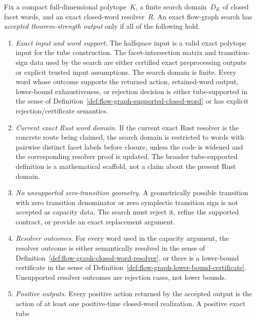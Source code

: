 \begin{unverified}
\begin{definition}%
\label{def:flow-graph-exact-accepted-output-contract}
Fix a compact full-dimensional polytope~$K$, a finite search domain~$D_K$ of
closed facet words, and an exact closed-word resolver~$R$.  An exact
flow-graph search has \emph{accepted theorem-strength output} only if all of
the following hold.
\begin{enumerate}
  \item \emph{Exact input and word support.}
    The halfspace input is a valid exact polytope input for the tube
    construction.  The facet-intersection matrix and transition-sign data used
    by the search are either certified exact preprocessing outputs or explicit
    trusted input assumptions.  The search domain is finite.  Every word whose
    outcome supports the returned action, retained-word output, lower-bound
    exhaustiveness, or rejection decision is either tube-supported in the sense
    of Definition~\ref{def:flow-graph-supported-closed-word} or has explicit
    rejection/certificate semantics.
  \item \emph{Current exact Rust word domain.}
    If the current exact Rust resolver is the concrete route being claimed, the
    search domain is restricted to words with pairwise distinct facet labels
    before closure, unless the code is widened and the corresponding resolver
    proof is updated.  The broader tube-supported definition is a mathematical
    scaffold, not a claim about the present Rust domain.
  \item \emph{No unsupported zero-transition geometry.}
    A geometrically possible transition with zero transition denominator or
    zero symplectic transition sign is not accepted as capacity data.  The
    search must reject it, refine the supported contract, or provide an exact
    replacement argument.
  \item \emph{Resolver outcomes.}
    For every word used in the capacity argument, the resolver outcome is
    either semantically resolved in the sense of
    Definition~\ref{def:flow-graph-closed-word-resolver}, or there is a
    lower-bound certificate in the sense of
    Definition~\ref{def:flow-graph-lower-bound-certificate}.  Unsupported
    resolver outcomes are rejection cases, not lower bounds.
  \item \emph{Positive outputs.}
    Every positive action returned by the accepted output is the action of at
    least one positive-time closed-word realization.  A positive exact tube

\end{enumerate}
\end{definition}
\end{unverified}

